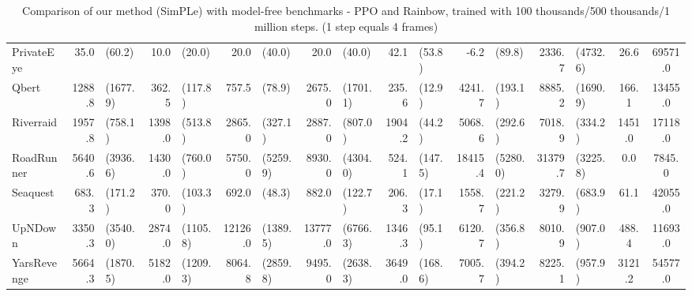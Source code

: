 \begin{landscape}
\begin{changemargin}{0cm}{0cm}
\begin{center}
\begin{table}[!htbp]
\begin{tabular}{l|rlrlrlrlrlrlrlcc}
PrivateEye     &     35.0 &     (60.2) &     10.0 &    (20.0) &       20.0 &       (40.0) &     20.0 &     (40.0) &     42.1 &   (53.8) &     -6.2 &     (89.8) &    2336.7 &   (4732.6) &     26.6 &  69571.0 \\
Qbert          &   1288.8 &   (1677.9) &    362.5 &   (117.8) &      757.5 &       (78.9) &   2675.0 &   (1701.1) &    235.6 &   (12.9) &   4241.7 &    (193.1) &    8885.2 &   (1690.9) &    166.1 &  13455.0 \\
Riverraid      &   1957.8 &    (758.1) &   1398.0 &   (513.8) &     2865.0 &      (327.1) &   2887.0 &    (807.0) &   1904.2 &   (44.2) &   5068.6 &    (292.6) &    7018.9 &    (334.2) &   1451.0 &  17118.0 \\
RoadRunner     &   5640.6 &   (3936.6) &   1430.0 &   (760.0) &     5750.0 &     (5259.9) &   8930.0 &   (4304.0) &    524.1 &  (147.5) &  18415.4 &   (5280.0) &   31379.7 &   (3225.8) &      0.0 &   7845.0 \\
Seaquest       &    683.3 &    (171.2) &    370.0 &   (103.3) &      692.0 &       (48.3) &    882.0 &    (122.7) &    206.3 &   (17.1) &   1558.7 &    (221.2) &    3279.9 &    (683.9) &     61.1 &  42055.0 \\
UpNDown        &   3350.3 &   (3540.0) &   2874.0 &  (1105.8) &    12126.0 &     (1389.5) &  13777.0 &   (6766.3) &   1346.3 &   (95.1) &   6120.7 &    (356.8) &    8010.9 &    (907.0) &    488.4 &  11693.0 \\
YarsRevenge    &   5664.3 &   (1870.5) &   5182.0 &  (1209.3) &     8064.8 &     (2859.8) &   9495.0 &   (2638.3) &   3649.0 &  (168.6) &   7005.7 &    (394.2) &    8225.1 &    (957.9) &   3121.2 &  54577.0 \\

\end{tabular}
\caption{Comparison of our method (SimPLe) with model-free benchmarks - PPO and Rainbow, trained with 100 thousands/500 thousands/1 million steps. (1 step equals 4 frames)}
\label{tab:ppo_rainbow_comparison}
\end{table}
\vspace*{\fill}
\end{center}
\end{changemargin}
\end{landscape}




